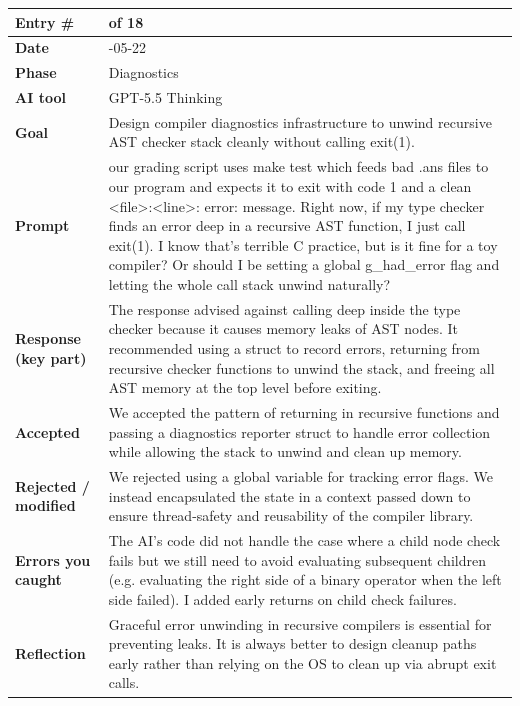 \documentclass[11pt,a4paper]{article}
\newcommand{\code}[1]{\texttt{\detokenize{#1}}}
\newcommand{\entrygap}{\vspace{8pt}}
\newenvironment{journalentry}{%
  \begin{center}\small\renewcommand{\arraystretch}{1.22}%
  \begin{tabular}{|>{\columncolor{anscodebg}\bfseries}p{3.0cm}|>{\RaggedRight\arraybackslash}p{12.25cm}|}%
  \hline
}{%
  \end{tabular}\end{center}\entrygap
}
\begin{document}
\begin{journalentry}
Entry \# & 18 of 18 \\ \hline
Date & 2026-05-22 \\ \hline
Phase & Diagnostics \\ \hline
AI tool & GPT-5.5 Thinking \\ \hline
Goal & Design compiler diagnostics infrastructure to unwind recursive AST checker stack cleanly without calling exit(1). \\ \hline
Prompt & our grading script uses make test which feeds bad .ans files to our program and expects it to exit with code 1 and a clean <file>:<line>: error: message. Right now, if my type checker finds an error deep in a recursive AST function, I just call exit(1). I know that's terrible C practice, but is it fine for a toy compiler? Or should I be setting a global g\_had\_error flag and letting the whole call stack unwind naturally? \\ \hline
Response (key part) & The response advised against calling \code{exit(1)} deep inside the type checker because it causes memory leaks of AST nodes. It recommended using a \code{Diagnostics} struct to record errors, returning \code{false} from recursive checker functions to unwind the stack, and freeing all AST memory at the top level before exiting. \\ \hline
Accepted & We accepted the pattern of returning \code{bool} in recursive functions and passing a diagnostics reporter struct to handle error collection while allowing the stack to unwind and clean up memory. \\ \hline
Rejected / modified & We rejected using a global variable for tracking error flags. We instead encapsulated the state in a \code{Diagnostics} context passed down to ensure thread-safety and reusability of the compiler library. \\ \hline
Errors you caught & The AI's code did not handle the case where a child node check fails but we still need to avoid evaluating subsequent children (e.g. evaluating the right side of a binary operator when the left side failed). I added early returns on child check failures. \\ \hline
Reflection & Graceful error unwinding in recursive compilers is essential for preventing leaks. It is always better to design cleanup paths early rather than relying on the OS to clean up via abrupt exit calls. \\ \hline
\end{journalentry}
\end{document}
